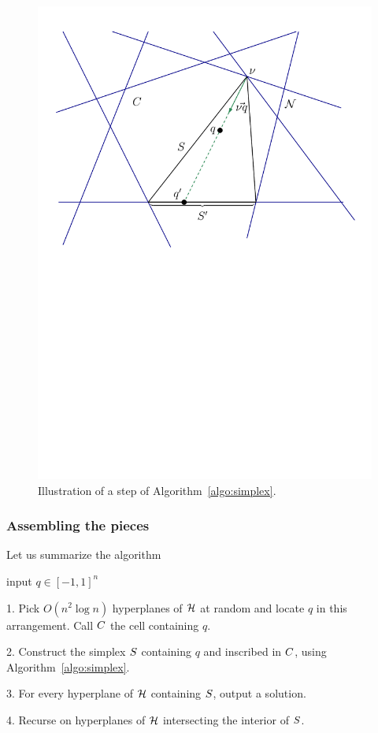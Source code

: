 \begin{figure}
\begin{center}
\includegraphics[trim=90 47 50 13,clip=true,height=0.25\textheight]{figures/simplex}
\caption{%
Illustration of a step of Algorithm~\ref{algo:simplex}.
}
\label{fig:meiser:step}
\end{center}
\end{figure}

\subsubsection{Assembling the pieces}

Let us summarize the algorithm
\begin{algorithm}\label{algo:meiser}
\item[input] \(q \in {[-1,1]}^n\)
\item[1.] Pick \(O(n^2 \log n)\) hyperplanes of $\mathcal{H}$ at random and locate $q$
in this arrangement. Call $C$ the cell containing $q$.
\item[2.] Construct the simplex \(S\) containing \(q\) and inscribed in
\(C\), using Algorithm~\ref{algo:simplex}.
\item[3.] For every hyperplane of $\mathcal{H}$ containing $S$, output a solution.
\item[4.] Recurse on hyperplanes of $\mathcal{H}$ intersecting the interior of $S$.
\end{algorithm}

